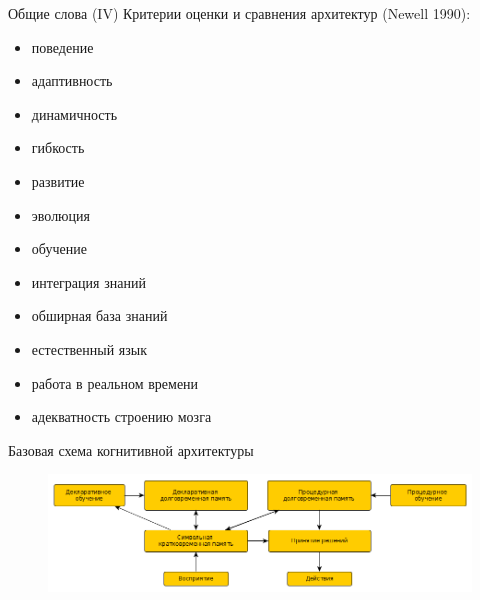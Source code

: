 \documentclass{beamer}
\begin{document}
\begin{frame}{Общие слова (IV)}
Критерии оценки и сравнения архитектур (Newell 1990):\\
\medskip
\begin{itemize}
	\item поведение
	\item адаптивность
	\item динамичность
	\item гибкость
	\item развитие
	\item эволюция
	\item обучение
	\item интеграция знаний
	\item обширная база знаний
	\item естественный язык
	\item работа в реальном времени
	\item адекватность строению мозга
\end{itemize}
\end{frame}


\begin{frame}{Базовая схема когнитивной архитектуры}
\begin{center}
	\begin{figure}[H]
		\includegraphics[scale=0.335]{prototypical_ca.png} 
	\end{figure}
\end{center}
\end{frame}
\end{document}
